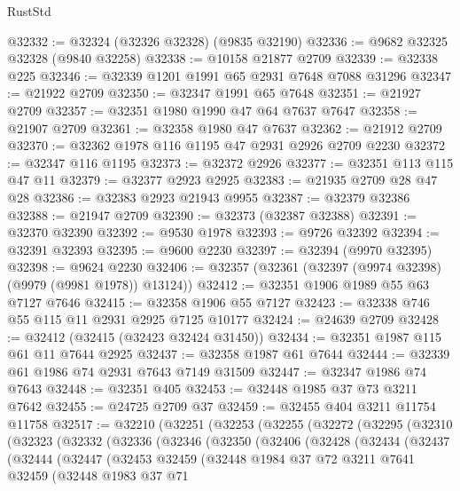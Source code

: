 \begin{lexlean}{RustStd}
\begin{coremodule}
@32332 := @32324 (@32326 @32328) (@9835 @32190)
@32336 := @9682 @32325 @32328 (@9840 @32258)
@32338 := @10158 @21877 @2709
@32339 := @32338 @225
@32346 := @32339 @1201 @1991 @65 @2931 @7648 @7088 @31296
@32347 := @21922 @2709
@32350 := @32347 @1991 @65 @7648
@32351 := @21927 @2709
@32357 := @32351 @1980 @1990 @47 @64 @7637 @7647
@32358 := @21907 @2709
@32361 := @32358 @1980 @47 @7637
@32362 := @21912 @2709
@32370 := @32362 @1978 @116 @1195 @47 @2931 @2926 @2709 @2230
@32372 := @32347 @116 @1195
@32373 := @32372 @2926
@32377 := @32351 @113 @115 @47 @11
@32379 := @32377 @2923 @2925
@32383 := @21935 @2709 @28 @47 @28
@32386 := @32383 @2923 @21943 @9955
@32387 := @32379 @32386
@32388 := @21947 @2709
@32390 := @32373 (@32387 @32388)
@32391 := @32370 @32390
@32392 := @9530 @1978
@32393 := @9726 @32392
@32394 := @32391 @32393
@32395 := @9600 @2230
@32397 := @32394 (@9970 @32395)
@32398 := @9624 @2230
@32406 := @32357 (@32361 (@32397 (@9974 @32398) (@9979 (@9981 @1978)) @13124))
@32412 := @32351 @1906 @1989 @55 @63 @7127 @7646
@32415 := @32358 @1906 @55 @7127
@32423 := @32338 @746 @55 @115 @11 @2931 @2925 @7125 @10177
@32424 := @24639 @2709
@32428 := @32412 (@32415 (@32423 @32424 @31450))
@32434 := @32351 @1987 @115 @61 @11 @7644 @2925
@32437 := @32358 @1987 @61 @7644
@32444 := @32339 @61 @1986 @74 @2931 @7643 @7149 @31509
@32447 := @32347 @1986 @74 @7643
@32448 := @32351 @405
@32453 := @32448 @1985 @37 @73 @3211 @7642
@32455 := @24725 @2709 @37
@32459 := @32455 @404 @3211 @11754 @11758
@32517 := @32210
    (@32251
      (@32253
        (@32255
          (@32272
            (@32295
              (@32310
                (@32323
                  (@32332
                    (@32336
                      (@32346
                        (@32350
                          (@32406
                            (@32428
                              (@32434
                                (@32437
                                  (@32444
                                    (@32447
                                      (@32453
                                        @32459
                                        (@32448
                                          @1984
                                          @37
                                          @72
                                          @3211
                                          @7641
                                          @32459
                                          (@32448
                                            @1983
                                            @37
                                            @71

\end{coremodule}
\end{lexlean}

